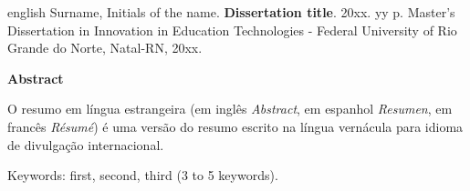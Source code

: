 \vspace{1cm}

\begin{resumo}[]
  \begin{otherlanguage*}{english}
Surname, Initials of the name. \textbf{Dissertation title}. 20xx. yy p. Master’s Dissertation in Innovation in Education Technologies - Federal University of Rio Grande do Norte, Natal-RN, 20xx.
\vspace{\onelineskip}
\vspace{\onelineskip}

\textbf{Abstract}
    
    O resumo em língua estrangeira (em inglês \textit{Abstract}, em espanhol \textit{Resumen}, em francês \textit{Résumé}) é uma versão do resumo escrito na língua vernácula para idioma de divulgação internacional.

    \vspace*{\fill}

    \noindent
    Keywords: first, second, third (3 to 5 keywords).
  \end{otherlanguage*}
\end{resumo}

